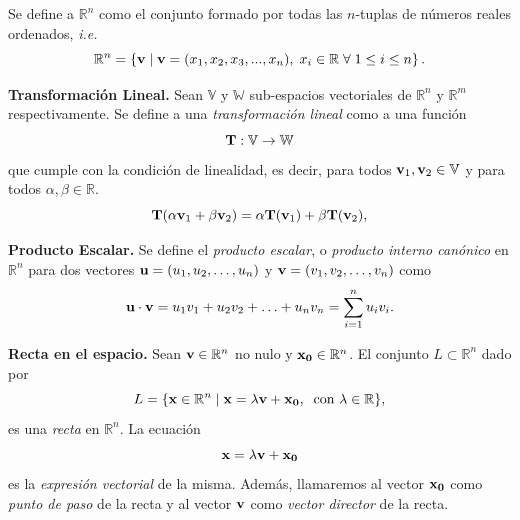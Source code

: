 \begin{definition}
  Se define a $\mathbb{R}^n$  como el conjunto formado por todas las $n$-tuplas de n\'umeros reales ordenados, \textit{i.e.}
    \begin{equation*}
        \mathbb{R}^n = \left\{ \vect{v}\;\rvert\;\vect{v}=(x_1,x_2,x_3,...,x_n), \; x_i \in \mathbb{R} \;\forall \;   1\leq  i \leq n  \right\}.
    \end{equation*}
\end{definition}

\begin{definition}{\textbf{Transformación Lineal.}}
  Sean  $\mathbb{V}$ y $\mathbb{W}$ sub-espacios vectoriales de $\mathbb{R}^n$ y  $\mathbb{R}^m$ respectivamente.  Se  define a  una \textit{transformación lineal}  como a  una función 
    \begin{equation*}
       \campoVec{T}: \mathbb{V} \rightarrow  \mathbb{W}
    \end{equation*}
    que cumple con la condición de linealidad, es decir,  para todos $\vect{v}_1,\vect{v}_2 \in \mathbb{V}$ y para todos $\alpha,\beta \in \mathbb{R}$. 
    \begin{equation}\label{tl}
        \campoVec{T}(\alpha\vect{v}_1 + \beta\vect{v}_2)=\alpha\campoVec{T}(\vect{v}_1) + \beta\campoVec{T}(\vect{v}_2),
    \end{equation}
 \label{def:TL}
\end{definition}

\begin{definition}{\textbf{Producto Escalar.}}
    Se define el \textit{producto escalar}, o \textit{producto interno canónico} en $\mathbb{R}^n$ para dos vectores
    $\vect{u}=(u_1, u_2,\ldots, u_n )$ y $\vect{v}=(v_1,v_2,\ldots,v_n)$ como
    \begin{equation*}
      \vect{u} \cdot \vect{v} = u_1v_1 + u_2v_2 + \ldots + u_nv_n = \sum_{i = 1}^{n} u_iv_i . 
    \end{equation*}
\end{definition}

\begin{definition} {\textbf{Recta en el espacio.}}
  Sean $\vect{v}\in\mathbb{R}^n$   no nulo y  $\vect{x_0}\in\mathbb{R}^n$.  El conjunto $L \subset \mathbb{R}^n $ dado por
 \begin{equation*}
      L = \{   \vect{x} \in\mathbb{R}^n  \;\rvert\;    \vect{x}=  \lambda  \vect{v} + \vect{x_0},  \:  \mbox{  con }  \lambda\in\mathbb{R} \},
    \end{equation*}  es una \textit{recta} en $ \mathbb{R}^n$. La ecuaci\'on $$ \vect{x}=  \lambda  \vect{v} + \vect{x_0}$$  es la  \emph{expresi\'on vectorial} de la misma.  
    Adem\'as, llamaremos al vector $\vect{x_0}$ como \emph{punto de paso} de la recta y al vector $\vect{v}$ como \emph{vector director} de la recta.
 \end{definition}

